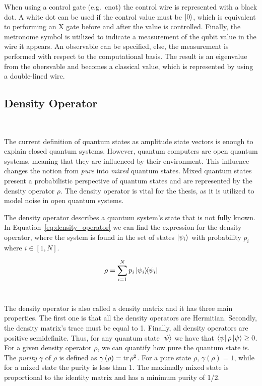 When using a control gate (e.g.~\ac{cnot}) the control wire is represented
with a black dot. A white dot can be used if the control value must be
\(\ket{0}\), which is equivalent to performing an X gate before and after
the value is controlled. Finally, the metronome symbol is utilized to indicate
a measurement of the qubit value in the wire it appears. An observable can be
specified, else, the measurement is performed with respect to the computational
basis. The result is an eigenvalue from the obersvable and becomes a
classical value, which is represented by using a double-lined wire. \

\subsection{Density Operator}\label{subsection:density_operator} \

The current definition of quantum states as amplitude state vectors is
enough to explain closed quantum systems. However, quantum computers
are open quantum systems, meaning that they are influenced by
their environment. This influence changes the notion from \textit{pure}
into \textit{mixed} quantum states. Mixed quantum states present a
probabilistic perspective of quantum states and are represented by the
density operator \(\rho\). The density operator is vital for the thesis,
as it is utilized to model noise in open quantum systems. \

The density operator describes a quantum system's state that is not
fully known. In Equation~\ref{eq:density_operator} we can find
the expression for the density operator, where the system is found
in the set of states \(\ket{\psi_i}\) with probability \(p_i\) where
\(i \in \left[1,N\right]\). \

\begin{equation}\label{eq:density_operator}
  \rho = \sum_{i=1}^{N}p_i\ketbra{\psi_i}{\psi_i}
\end{equation} \

The density operator is also called a density matrix and it has three main
properties. The first one is that all the density operators are Hermitian.
Secondly, the density matrix's trace must be equal to 1. Finally, all
density operators are positive semidefinite. Thus, for any quantum state
\(\ket{\psi}\) we have that \(\bra{\psi}\rho\ket{\psi} \geq 0\). For a
given density operator \(\rho\), we can quantify how pure the quantum
state is. The \textit{purity} \(\gamma\) of \(\rho\) is defined as 
\(\gamma\left(\rho\right) = \trace{\rho^2}\). For a pure state \(\rho\),
\(\gamma\left(\rho\right) = 1\), while for a mixed state the purity is less
than 1. The maximally mixed state is proportional to the identity matrix
and has a minimum purity of 1/2. \

